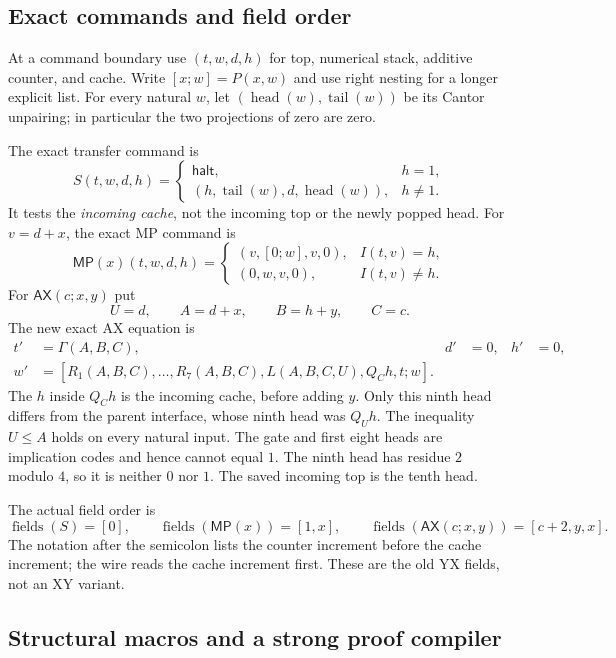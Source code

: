 \subsection{Exact commands and field order}

At a command boundary use $(t,w,d,h)$ for top, numerical stack, additive
counter, and cache.  Write $[x;w]=P(x,w)$ and use right nesting for a
longer explicit list.  For every natural $w$, let
$(\operatorname{head}(w),\operatorname{tail}(w))$ be its Cantor unpairing;
in particular the two projections of zero are zero.

The exact transfer command is
\[
 S(t,w,d,h)=
 \begin{cases}
  \mathsf{halt},&h=1,\\
  (h,\operatorname{tail}(w),d,\operatorname{head}(w)),&h\ne1.
 \end{cases}
\]
It tests the \emph{incoming cache}, not the incoming top or the newly
popped head.  For $v=d+x$, the exact MP command is
\[
 \mathsf{MP}(x)(t,w,d,h)=
 \begin{cases}
  (v,[0;w],v,0),&I(t,v)=h,\\
  (0,w,v,0),&I(t,v)\ne h.
 \end{cases}
\]
For $\mathsf{AX}(c;x,y)$ put
\[
 U=d,\qquad A=d+x,\qquad B=h+y,\qquad C=c.
\]
The new exact AX equation is
\begin{align*}
 t'&=\Gamma(A,B,C),&d'&=0,&h'&=0,\\
 w'&=[R_1(A,B,C),\ldots,R_7(A,B,C),
          L(A,B,C,U),Q_C h,t;w].
\end{align*}
The $h$ inside $Q_Ch$ is the incoming cache, before adding $y$.
Only this ninth head differs from the parent interface, whose ninth head
was $Q_Uh$.  The inequality $U\le A$ holds on every natural input.
The gate and first eight heads are implication codes and hence cannot
equal $1$.  The ninth head has residue $2$ modulo $4$, so it is neither
$0$ nor $1$.  The saved incoming top is the tenth head.

The actual field order is
\[
 \operatorname{fields}(S)=[0],\qquad
 \operatorname{fields}(\mathsf{MP}(x))=[1,x],\qquad
 \operatorname{fields}(\mathsf{AX}(c;x,y))=[c+2,y,x].
\]
The notation after the semicolon lists the counter increment before the
cache increment; the wire reads the cache increment first.  These are the
old YX fields, not an XY variant.

\subsection{Structural macros and a strong proof compiler}

